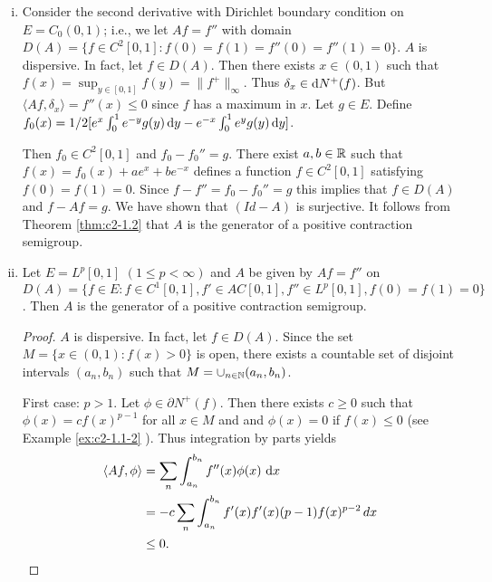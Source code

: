 \begin{examples}\label{ex:c2-1.5}
\begin{enumerate}[(i)]  %
\item \label{ex:c2-1.5-1}
Consider the second derivative with Dirichlet boundary condition on $E = C_{0}(0,1)$; i.e., we let $Af = f''$ with domain $D(A) = \{f \in C^{2}[0,1] : f(0) = f(1) = f''(0) = f''(1) = 0\}$.
$A$ is dispersive. 
In fact, let $f \in D(A)$. 
Then there exists $x \in (0,1)$ such that $f(x) = \sup_{y \in [0,1]} f(y) = \|f^{+}\|_{\infty}$. 
Thus $\delta_{x} \in \mathop{}\!\mathrm{d}{N^{+}}(f)$. 
But $\langle Af,\delta_{x} \rangle = f''(x) \leq 0$ since $f$ has a maximum in $x$.
Let $g \in E$. 
Define $f_{0}(x) = 1/2 [e^{x} \int_{0}^{1} e^{-y}g(y) \mathop{}\!\mathrm{d}{y} - e^{-x} \int_{0}^{1} e^{y}g(y) \mathop{}\!\mathrm{d}{y}]$.

Then $f_{0} \in C^{2}[0,1]$ and $f_{0} - f_{0}'' = g$. 
There exist $a, b \in \mathbb{R}$ such that $f(x) = f_{0}(x) + ae^{x} + be^{-x}$ defines a function $f \in C^{2}[0,1]$ satisfying $f(0) = f(1) = 0$. Since $f - f'' = f_{0} - f_{0}'' = g$ this implies that $f \in D(A)$ and $f - Af = g$. We have shown that $(Id - A)$ is surjective. It follows from Theorem 
\ref{thm:c2-1.2}    that $A$ is the generator of a positive contraction semigroup.
\item \label{ex:c2-1.5-2}
Let $E = L^{p}[0,1]$ $(1 \leq p < \infty)$ and $A$ be given by $Af = f''$ on $D(A) = \{f \in E : f \in C^{1}[0,1], f' \in AC[0,1], f'' \in L^{p}[0,1], f(0) = f(1) = 0\}$. 
Then $A$ is the generator of a positive contraction semigroup.
\begin{proof}
$A$ is dispersive. 
In fact, let $f \in D(A)$. 
Since the set $M = \{x \in (0,1) : f(x) > 0\}$ is open, there exists a countable set of disjoint intervals $(a_{n},b_{n})$ such that $M = \cup_{n \in \mathbb{N}} (a_{n},b_{n})$.

First case: $p > 1$.
Let $\phi \in \partial N^{+}(f)$. 
Then there exists $c \geq 0$ such that $\phi(x) = c f(x)^{p-1}$ for all $x \in M$ and and $\phi(x) = 0$ if $f(x) \leq 0$ (see Example \ref{ex:c2-1.1-2} ). 
Thus integration by parts yields
\begin{align*}
\langle Af,\phi \rangle &= \sum_{n} \int_{a_{n}}^{b_{n}} f''(x)\phi(x) \, \mathop{}\!\mathrm{d}{x} \\
&= -c \sum_{n} \int_{a_{n}}^{b_{n}} f'(x)f'(x) (p-1)f(x)^{p-2} \, dx \\
&\leq 0.
\end{align*}


\end{proof}
\end{enumerate}
\end{examples}
